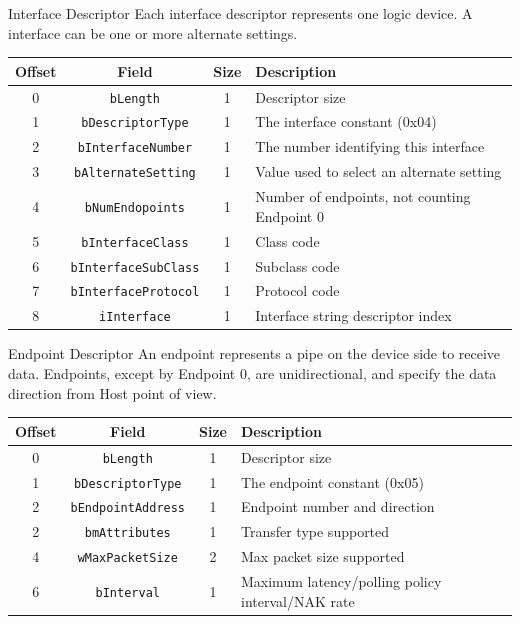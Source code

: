 \documentclass[pdf]{beamer}
\begin{document}
\begin{frame}{Interface Descriptor}
  \transdissolve
  Each interface descriptor represents one logic device.
  A interface can be one or more alternate settings.
  \begin{table}
    \tiny
    \begin{tabular}{| c | c | c | l |}
      \hline
      \textbf{Offset} & \textbf{Field} & \textbf{Size} & \textbf{Description} \\ \hline \hline
      0 & \texttt{bLength} & 1 & Descriptor size \\ \hline
      1 & \texttt{bDescriptorType} & 1 & The interface constant (0x04) \\ \hline
      2 & \texttt{bInterfaceNumber} & 1 & The number identifying this interface \\ \hline
      3 & \texttt{bAlternateSetting} & 1 & Value used to select an alternate setting \\ \hline
      4 & \texttt{bNumEndopoints} & 1 & Number of endpoints, not counting Endpoint 0 \\ \hline
      5 & \texttt{bInterfaceClass} & 1 & Class code \\ \hline
      6 & \texttt{bInterfaceSubClass} & 1 & Subclass code \\ \hline
      7 & \texttt{bInterfaceProtocol} & 1 & Protocol code \\ \hline
      8 & \texttt{iInterface} & 1 & Interface string descriptor index \\ \hline
    \end{tabular}
  \end{table}
\end{frame}

\begin{frame}{Endpoint Descriptor}
  \transdissolve
  An endpoint represents a pipe on the device side to receive data.
  Endpoints, except by Endpoint 0, are unidirectional, and specify
  the data direction from Host point of view.
  \begin{table}
    \tiny
    \begin{tabular}{| c | c | c | l |}
      \hline
      \textbf{Offset} & \textbf{Field} & \textbf{Size} & \textbf{Description} \\ \hline \hline
      0 & \texttt{bLength} & 1 & Descriptor size \\ \hline
      1 & \texttt{bDescriptorType} & 1 & The endpoint constant (0x05) \\ \hline
      2 & \texttt{bEndpointAddress} & 1 & Endpoint number and direction \\ \hline
      2 & \texttt{bmAttributes} & 1 & Transfer type supported \\ \hline
      4 & \texttt{wMaxPacketSize} & 2 & Max packet size supported \\ \hline
      6 & \texttt{bInterval} & 1 & Maximum latency/polling policy interval/NAK rate \\ \hline
    \end{tabular}
  \end{table}
\end{frame}
\end{document}
